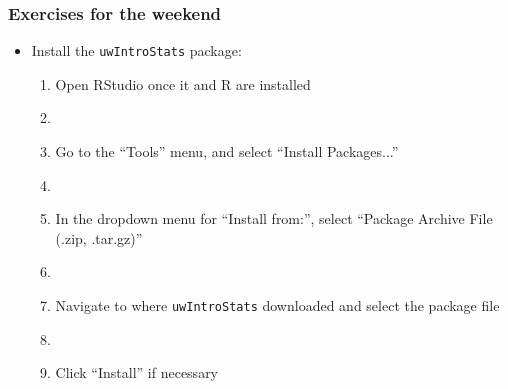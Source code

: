 \documentclass[12pt]{beamer}
\newcommand{\myframe}[1]{\begin{frame} \frametitle{#1}}
\begin{document}
\myframe{Exercises for the weekend}
\begin{itemize}
\item Install the \texttt{uwIntroStats} package:
\begin{enumerate}
\item Open RStudio once it and R are installed
\item[]
\item Go to the ``Tools'' menu, and select ``Install Packages...''
\item[]
\item In the dropdown menu for ``Install from:'', select ``Package Archive File (.zip, .tar.gz)''
\item[]
\item Navigate to where \texttt{uwIntroStats} downloaded and select the package file
\item[]
\item Click ``Install'' if necessary
\end{enumerate}
\end{itemize}
\end{frame}
\end{document}
